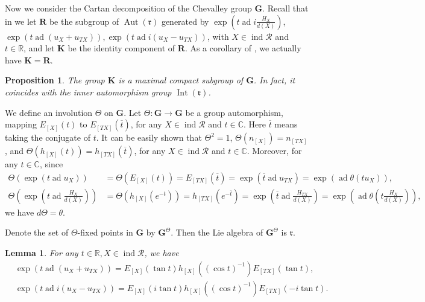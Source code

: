\documentclass[12pt]{amsart}
\newtheorem{lemma}[theorem]{Lemma}
\newtheorem{proposition}[theorem]{Proposition}
\begin{document}
Now we consider the Cartan decomposition of the Chevalley group $\mathbf{G}$.
Recall that in \cite{notes2} we let $\mathbf{R}$ be the subgroup of $\operatorname{Aut}(\mathfrak{r})$ generated by $\operatorname{exp}(t\operatorname{ad}i\frac{H_X}{d(X)})$, $\operatorname{exp}(t\operatorname{ad}(u_X+u_{TX})),\operatorname{exp}(t\operatorname{ad}i(u_X-u_{TX}))$, with $X\in \operatorname{ind}\mathcal{R}$ and $t\in \mathbb{R}$, and let $\mathbf{K}$ be the identity component of $\mathbf{R}$.
As a corollary of \cite[Remark 37]{notes2}, we actually have $\mathbf{K}=\mathbf{R}$.

\begin{proposition}
    \cite[Proposition 36]{notes2}
    The group $\mathbf{K}$ is a maximal compact subgroup of $\mathbf{G}$. 
    In fact, it coincides with the inner automorphism group  $\operatorname{Int}(\mathfrak{r})$.
\end{proposition}

We define an involution $\Theta$ on $\mathbf{G}$.
Let $\Theta:\mathbf{G}\rightarrow \mathbf{G}$ be a group automorphism, mapping $E_{[X]}(t)$ to $E_{[TX]}(\overline{t})$, for any $X\in \operatorname{ind}\mathcal{R}$ and $t\in \mathbb{C}$.
Here $\overline{t}$ means taking the conjugate of $t$.
It can be easily shown that $\Theta^2=1$, $\Theta(n_{[X]})=n_{[TX]}$, and $\Theta(h_{[X]}(t))=h_{[TX]}(\overline{t})$, for any $X\in \operatorname{ind}\mathcal{R}$ and $t\in \mathbb{C}$.
Moreover, for any $t\in \mathbb{C}$, since
\begin{align*}
     \Theta(\operatorname{exp}(t\operatorname{ad}u_X))&=\Theta(E_{[X]}(t))  =E_{[TX]}(\overline{t})=\operatorname{exp}(\overline{t}\operatorname{ad}u_{TX})=\operatorname{exp}(\operatorname{ad}\theta(tu_X)),\\
     \Theta(\operatorname{exp}(t\operatorname{ad}\frac{H_X}{d(X)}))&=\Theta(h_{[X]}(e^{-t}))=h_{[TX]}(e^{-\overline{t}})=\operatorname{exp}(\overline{t}\operatorname{ad}\frac{H_{TX}}{d(X)})=\operatorname{exp}(\operatorname{ad}\theta(t\frac{H_X}{d(X)})),
\end{align*}
we have $d\Theta=\theta$.

Denote the set of $\Theta$-fixed points in $\mathbf{G}$ by $\mathbf{G}^{\Theta}$.
Then the Lie algebra of $\mathbf{G}^{\Theta}$ is $\mathfrak{r}$.

\begin{lemma}
    \cite[Lemma 31]{notes2}
    For any $t\in \mathbb{R}, X\in \operatorname{ind}\mathcal{R}$, we have 
    \begin{align*}
       & \operatorname{exp}(t\operatorname{ad}(u_X+u_{TX}))=E_{[X]}(\operatorname{tan}t)h_{[X]}((\operatorname{cos}t)^{-1})E_{[TX]}(\operatorname{tan}t),\\
        & \operatorname{exp}(t\operatorname{ad}i(u_X-u_{TX}))=E_{[X]}(i\operatorname{tan}t)h_{[X]}((\operatorname{cos}t)^{-1})E_{[TX]}(-i\operatorname{tan}t).
    \end{align*}
\end{lemma}
\end{document}
